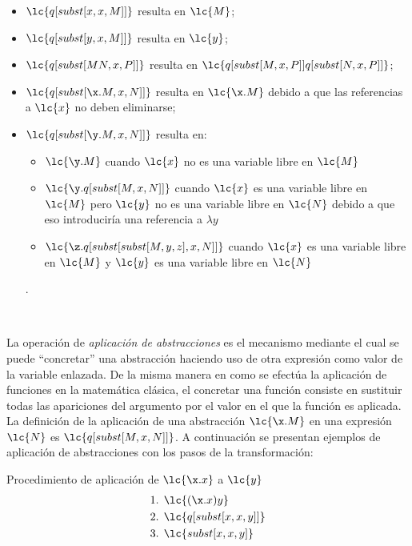 \begin{itemize}
\item \(\lc{q[subst[x,x,M]]}\) resulta en \(\lc{M}\);
\item \(\lc{q[subst[y,x,M]]}\) resulta en \(\lc{y}\);
\item \(\lc{q[subst[M N, x, P]]}\) resulta en \(\lc{q[subst[M, x, P]] q[subst[N, x, P]]}\);
\item \(\lc{q[subst[\x.M, x, N]]}\) resulta en \(\lc{\x.M}\) debido a que las referencias a \(\lc{x}\) no deben eliminarse;
\item \(\lc{q[subst[\y.M, x, N]]}\) resulta en:
  \begin{itemize}
  \item \(\lc{\y.M}\) cuando \(\lc{x}\) no es una variable libre en \(\lc{M}\)
  \item \(\lc{\y.q[subst[M, x, N]]}\) cuando \(\lc{x}\) es una variable libre en \(\lc{M}\) pero \(\lc{y}\) no es una variable libre en \(\lc{N}\) debido a que eso introduciría una referencia a \(\lambda y\)
  \item \(\lc{\z.q[subst[subst[M,y,z],x,N]]}\) cuando \(\lc{x}\) es una variable libre en \(\lc{M}\) y \(\lc{y}\) es una variable libre en \(\lc{N}\)
  \end{itemize}.
\end{itemize} \

La operación de \emph{aplicación de abstracciones} es el mecanismo mediante el cual se puede ``concretar'' una abstracción haciendo uso de otra expresión como valor de la variable enlazada. De la misma manera en como se efectúa la aplicación de funciones en la matemática clásica, el concretar una función consiste en sustituir todas las apariciones del argumento por el valor en el que la función es aplicada. \\

La definición de la aplicación de una abstracción \(\lc{\x.M}\) en una expresión \(\lc{N}\) es \(\lc{q[subst[M,x,N]]}\). A continuación se presentan ejemplos de aplicación de abstracciones con los pasos de la transformación: \\

\begin{ejemplo} Procedimiento de aplicación de \(\lc{\x.x}\) a \(\lc{y}\)
  \label{ejemplo:aplicacion3}
  \begin{align*}
    \text{1. } &\lc{(\x.x)y} \\
    \text{2. } &\lc{q[subst[x,x,y]]} \\
    \text{3. } &\lc{subst[x,x,y]}
  \end{align*}
\end{ejemplo} \

